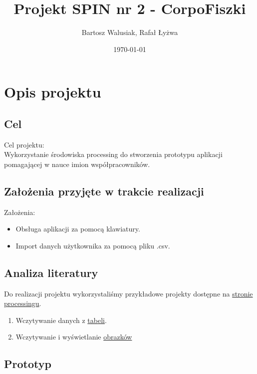 \documentclass[11pt]{article}
\begin{document}
    \title{Projekt SPIN nr 2 - CorpoFiszki}
    \author{Bartosz Walusiak, Rafał Łyżwa}
    \date{\today}
    \maketitle

    \tableofcontents

    \newpage

    \section{Opis projektu}\label{sec:description}
    \subsection{Cel}\label{subsec:target}
    Cel projektu:\\
    Wykorzystanie środowiska processing do stworzenia prototypu aplikacji pomagającej w nauce imion współpracowników.

    \subsection{Założenia przyjęte w trakcie realizacji}\label{subsec:design-choices}
    Założenia:
    \begin{itemize}
        \item Obsługa aplikacji za pomocą klawiatury.
        \item Import danych użytkownika za pomocą pliku .csv.
    \end{itemize}

    \subsection{Analiza literatury}\label{subsec:research}

    Do realizacji projektu wykorzystaliśmy przykładowe projekty dostępne na \href{https://processing.org/examples/}{stronie processingu}.
    \begin{enumerate}
        \item Wczytywanie danych z \href{https://processing.org/examples/loadsavetable.html}{tabeli}.
        \item Wczytywanie i wyświetlanie \href{https://processing.org/examples/loaddisplayimage.html}{obrazków}
    \end{enumerate}

    \subsection{Prototyp}\label{subsec:prototype}
\end{document}
